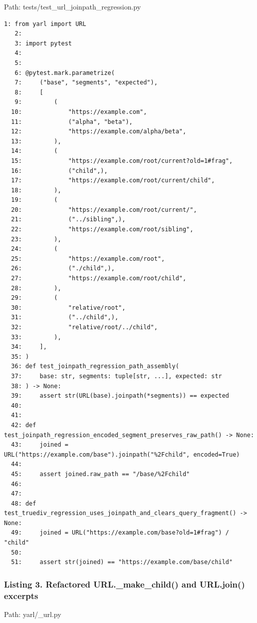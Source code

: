 \documentclass[11pt,a4paper]{article}
\begin{document}
Path: tests/test\_url\_joinpath\_regression.py


\begin{Verbatim}[breaklines=true,fontsize=\scriptsize]
1: from yarl import URL
   2: 
   3: import pytest
   4: 
   5: 
   6: @pytest.mark.parametrize(
   7:     ("base", "segments", "expected"),
   8:     [
   9:         (
  10:             "https://example.com",
  11:             ("alpha", "beta"),
  12:             "https://example.com/alpha/beta",
  13:         ),
  14:         (
  15:             "https://example.com/root/current?old=1#frag",
  16:             ("child",),
  17:             "https://example.com/root/current/child",
  18:         ),
  19:         (
  20:             "https://example.com/root/current/",
  21:             ("../sibling",),
  22:             "https://example.com/root/sibling",
  23:         ),
  24:         (
  25:             "https://example.com/root",
  26:             ("./child",),
  27:             "https://example.com/root/child",
  28:         ),
  29:         (
  30:             "relative/root",
  31:             ("../child",),
  32:             "relative/root/../child",
  33:         ),
  34:     ],
  35: )
  36: def test_joinpath_regression_path_assembly(
  37:     base: str, segments: tuple[str, ...], expected: str
  38: ) -> None:
  39:     assert str(URL(base).joinpath(*segments)) == expected
  40: 
  41: 
  42: def test_joinpath_regression_encoded_segment_preserves_raw_path() -> None:
  43:     joined = URL("https://example.com/base").joinpath("%2Fchild", encoded=True)
  44: 
  45:     assert joined.raw_path == "/base/%2Fchild"
  46: 
  47: 
  48: def test_truediv_regression_uses_joinpath_and_clears_query_fragment() -> None:
  49:     joined = URL("https://example.com/base?old=1#frag") / "child"
  50: 
  51:     assert str(joined) == "https://example.com/base/child"
\end{Verbatim}


\subsubsection*{Listing 3. Refactored URL.\_make\_child() and URL.join() excerpts}


Path: yarl/\_url.py
\end{document}
